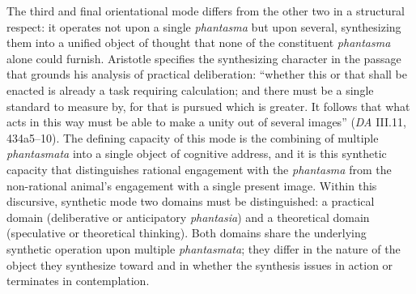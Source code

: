 The third and final orientational mode differs from the other two in a structural respect: it operates not upon a single \textit{phantasma} but upon several, synthesizing them into a unified object of thought that none of the constituent \textit{phantasma} alone could furnish. Aristotle specifies the synthesizing character in the passage that grounds his analysis of practical deliberation: ``whether this or that shall be enacted is already a task requiring calculation; and there must be a single standard to measure by, for that is pursued which is greater. It follows that what acts in this way must be able to make a unity out of several images'' (\textit{DA} III.11, 434a5--10). The defining capacity of this mode is the combining of multiple \textit{phantasmata} into a single object of cognitive address, and it is this synthetic capacity that distinguishes rational engagement with the \textit{phantasma} from the non-rational animal's engagement with a single present image. Within this discursive, synthetic mode two domains must be distinguished: a practical domain (deliberative or anticipatory \textit{phantasia}) and a theoretical domain (speculative or theoretical thinking). Both domains share the underlying synthetic operation upon multiple \textit{phantasmata}; they differ in the nature of the object they synthesize toward and in whether the synthesis issues in action or terminates in contemplation. 

